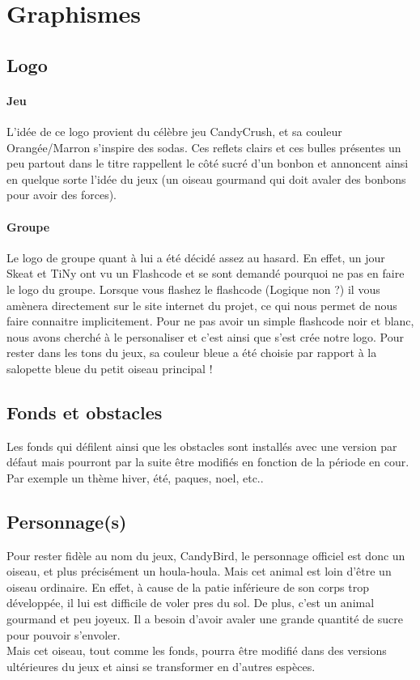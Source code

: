 \documentclass [11pt]{report}
\begin{document}
	\section{Graphismes}
		\subsection {Logo}
			\paragraph{Jeu}
			L'idée de ce logo provient du célèbre jeu CandyCrush, et sa couleur Orangée/Marron s'inspire des sodas. Ces reflets clairs et ces bulles présentes un peu partout dans le titre rappellent le côté sucré d'un bonbon et annoncent ainsi en quelque sorte l'idée du jeux (un oiseau gourmand qui doit avaler des bonbons pour avoir des forces). 

			\paragraph{Groupe}
			Le logo de groupe quant à lui a été décidé assez au hasard. En effet, un jour Skeat et TiNy ont vu un Flashcode et se sont demandé pourquoi ne pas en faire le logo du groupe. Lorsque vous flashez le flashcode (Logique non ?) il vous amènera directement sur le site internet du projet, ce qui nous permet de nous faire connaitre implicitement. Pour ne pas avoir un simple flashcode noir et blanc, nous avons cherché à le personaliser et c'est ainsi que s'est crée notre logo. Pour rester dans les tons du jeux, sa couleur bleue a été choisie par rapport à la salopette bleue du petit oiseau principal !\\\vspace{5mm}

		\subsection {Fonds et obstacles}
 		Les fonds qui défilent ainsi que les obstacles sont installés avec une version par défaut mais pourront par la suite être modifiés en fonction de la période en cour. Par exemple un thème hiver, été, paques, noel, etc..\\\vspace{5mm}

		\subsection {Personnage(s)}
 		Pour rester fidèle au nom du jeux, CandyBird, le personnage officiel est donc un oiseau, et plus précisément un houla-houla.
 		Mais cet animal est loin d'être un oiseau ordinaire. En effet, à cause de la patie inférieure de son corps trop développée, il lui est difficile de voler pres du sol. De plus, c'est un animal gourmand et peu joyeux. Il a besoin d'avoir avaler une grande quantité de sucre pour pouvoir s'envoler.\\
Mais cet oiseau, tout comme les fonds, pourra être modifié dans des versions ultérieures du jeux et ainsi se transformer en d'autres espèces.\\\vspace{5mm}
\end{document}
